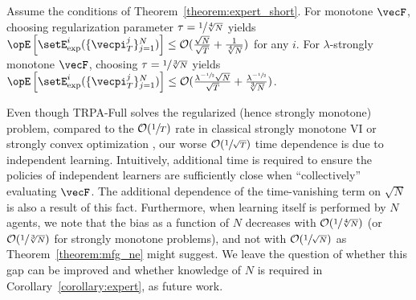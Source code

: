 \begin{corollary}\label{corollary:expert}
Assume the conditions of Theorem~\ref{theorem:expert_short}.
For monotone $\vecF$, choosing regularization parameter $\tau = \sfrac{1}{\sqrt[4]{N}}$ yields
$\Exop\left[\setE^i_{\text{exp}}(\{\vecpi^j_T\}_{j=1}^N) \right] \leq \mathcal{O}(\frac{\sqrt{N}}{\sqrt{T}} + \frac{1}{\sqrt[4]{N}})$ for any $i$.
For $\lambda$-strongly monotone $\vecF$, choosing $\tau = \sfrac{1}{\sqrt[3]{N}}$ yields $\Exop\left[\setE^i_{\text{exp}}(\{\vecpi^j_T\}_{j=1}^N) \right] \leq \mathcal{O}(\frac{ \lambda^{-\sfrac{1}{2}} \sqrt{N}}{\sqrt{T}} + \frac{\lambda^{-\sfrac{1}{2}}}{\sqrt[3]{N}})$.
\end{corollary}

Even though TRPA-Full solves the regularized (hence strongly monotone) problem, compared to the $\mathcal{O}(\sfrac{1}{T})$ rate in classical strongly monotone VI \citep{kotsalis2022simple} or strongly convex optimization \citep{rakhlin2011making},
our worse $\mathcal{O}(\sfrac{1}{\sqrt{T}})$ time dependence is due to independent learning.
Intuitively, additional time is required to ensure the policies of independent learners are sufficiently close when ``collectively'' evaluating $\vecF$.
The additional dependence of the time-vanishing term on $\sqrt{N}$ is also a result of this fact.
Furthermore, when learning itself is performed by $N$ agents, we note that the bias as a function of $N$ decreases with $\mathcal{O}(\sfrac{1}{\sqrt[4]{N}})$ (or $\mathcal{O}(\sfrac{1}{\sqrt[3]{N}})$ for strongly monotone problems), and not with $\mathcal{O}(\sfrac{1}{\sqrt{N}})$ as Theorem~\ref{theorem:mfg_ne} might suggest.
We leave the question of whether this gap can be improved and whether knowledge of $N$ is required in Corollary~\ref{corollary:expert}, as future work.

